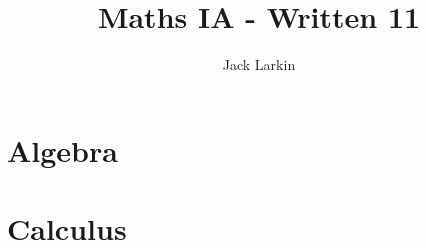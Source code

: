 \documentclass[11pt]{article}
\title{\textbf{Maths IA - Written 11}}
\date{}
\author{Jack Larkin}
\begin{document}
\maketitle
\section*{Algebra}

\section*{Calculus}
\end{document}
